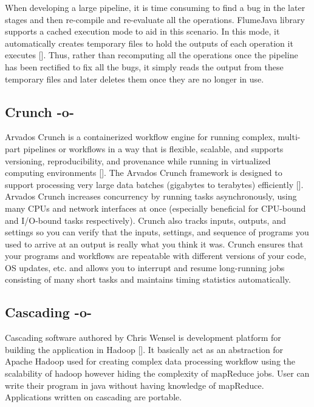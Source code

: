 When developing a large pipeline, it is time consuming to find a bug
in the later stages and then re-compile and re-evaluate all the
operations. FlumeJava library supports a cached execution mode to aid
in this scenario. In this mode, it automatically creates temporary
files to hold the outputs of each operation it
executes [\cite{flumejava-paper}]. Thus, rather than recomputing all the
operations once the pipeline has been rectified to fix all the bugs,
it simply reads the output from these temporary files and later
deletes them once they are no longer in use.



\subsection{Crunch -o-}

Arvados Crunch is a containerized workflow engine for running complex,
multi-part pipelines or workflows in a way that is flexible, scalable,
and supports versioning, reproducibility, and provenance while running
in virtualized computing environments [\cite{www-arvados}]. The Arvados
Crunch framework is designed to support processing very large data
batches (gigabytes to terabytes)
efficiently [\cite{www-crunch}]. Arvados Crunch increases concurrency by
running tasks asynchronously, using many CPUs and network interfaces
at once (especially beneficial for CPU-bound and I/O-bound tasks
respectively). Crunch also tracks inputs, outputs, and settings so you
can verify that the inputs, settings, and sequence of programs you
used to arrive at an output is really what you think it was. Crunch
ensures that your programs and workflows are repeatable with different
versions of your code, OS updates, etc. and allows you to interrupt
and resume long-running jobs consisting of many short tasks and
maintains timing statistics automatically.



\subsection{Cascading -o-}

Cascading software authored by Chris Wensel is development platform
for building the application in Hadoop [\cite{www-cascading}].  It
basically act as an abstraction for Apache Hadoop used for creating
complex data processing workflow using the scalability of hadoop
however hiding the complexity of mapReduce jobs.  User can write their
program in java without having knowledge of mapReduce. Applications
written on cascading are portable.
 
